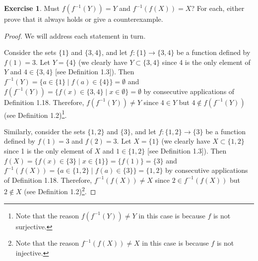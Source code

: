 \documentclass[titlepage]{article}
\newcounter{script}
\theoremstyle{definition}
\newtheorem{exercise}{Exercise}[script]
\begin{document}
\setcounter{exercise}{18}

\begin{exercise}
    Must $f(f^{-1}(Y))=Y$ and $f^{-1}(f(X))=X$? For each, either prove that it always holds or give a counterexample.
    \begin{proof}
        We will address each statement in turn.\par
        Consider the sets $\{1\}$ and $\{3,4\}$, and let $f:\{1\}\to\{3,4\}$ be a function defined by $f(1)=3$. Let $Y=\{4\}$ (we clearly have $Y\subset\{3,4\}$ since 4 is the only element of $Y$ and $4\in\{3,4\}$ [see Definition 1.3]). Then $f^{-1}(Y)=\{a\in\{1\}\mid f(a)\in\{4\}\}=\emptyset$ and $f(f^{-1}(Y))=\{f(x)\in\{3,4\}\mid x\in\emptyset\}=\emptyset$ by consecutive applications of Definition 1.18. Therefore, $f(f^{-1}(Y))\neq Y$ since $4\in Y$ but $4\notin f(f^{-1}(Y))$ (see Definition 1.2)\footnote{Note that the reason $f(f^{-1}(Y))\neq Y$ in this case is because $f$ is not surjective.}.\par
        Similarly, consider the sets $\{1,2\}$ and $\{3\}$, and let $f:\{1,2\}\to\{3\}$ be a function defined by $f(1)=3$ and $f(2)=3$. Let $X=\{1\}$ (we clearly have $X\subset\{1,2\}$ since 1 is the only element of $X$ and $1\in\{1,2\}$ [see Definition 1.3]). Then $f(X)=\{f(x)\in\{3\}\mid x\in\{1\}\}=\{f(1)\}=\{3\}$ and $f^{-1}(f(X))=\{a\in\{1,2\}\mid f(a)\in\{3\}\}=\{1,2\}$ by consecutive applications of Definition 1.18. Therefore, $f^{-1}(f(X))\neq X$ since $2\in f^{-1}(f(X))$ but $2\notin X$ (see Definition 1.2)\footnote{Note that the reason $f^{-1}(f(X))\neq X$ in this case is because $f$ is not injective.}.
    \end{proof}
\end{exercise}

\setcounter{proposition}{25}
\end{document}
